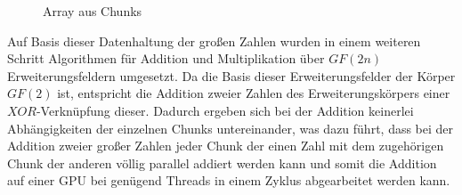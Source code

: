 \begin{figure}
\centering

\caption{Array aus Chunks} \label{fig:chunk_array}
\end{figure}

Auf Basis dieser Datenhaltung der großen Zahlen wurden in einem weiteren Schritt Algorithmen für Addition und Multiplikation über $GF(2n)$ Erweiterungsfeldern umgesetzt. Da die Basis dieser Erweiterungsfelder der Körper $GF(2)$ ist, entspricht die Addition zweier Zahlen des Erweiterungskörpers einer $XOR$-Verknüpfung dieser. Dadurch ergeben sich bei der Addition keinerlei Abhängigkeiten der einzelnen Chunks untereinander, was dazu führt, dass bei der Addition zweier großer Zahlen jeder Chunk der einen Zahl mit dem zugehörigen Chunk der anderen völlig parallel addiert werden kann und somit die Addition auf einer GPU bei genügend Threads in einem Zyklus abgearbeitet werden kann.\newline

